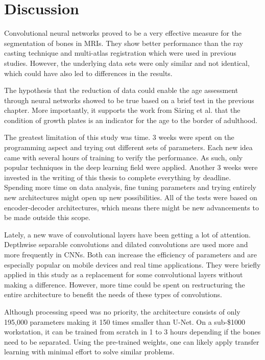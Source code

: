 \section{Discussion}

Convolutional neural networks proved to be a very effective measure for the segmentation of bones in MRIs. They show better performance than the ray casting technique and multi-atlas registration which were used in previous studies. However, the underlying data sets were only similar and not identical, which could have also led to differences in the results.

The hypothesis that the reduction of data could enable the age assessment through neural networks showed to be true based on a brief test in the previous chapter. More importantly, it supports the work from Säring et al. that the condition of growth plates is an indicator for the age to the border of adulthood.

The greatest limitation of this study was time. 3 weeks were spent on the programming aspect and trying out different sets of parameters. Each new idea came with several hours of training to verify the performance. As such, only popular techniques in the deep learning field were applied. Another 3 weeks were invested in the writing of this thesis to complete everything by deadline. Spending more time on data analysis, fine tuning parameters and trying entirely new architectures might open up new possibilities. All of the tests were based on encoder-decoder architectures, which means there might be new advancements to be made outside this scope.

Lately, a new wave of convolutional layers have been getting a lot of attention. Depthwise separable convolutions and dilated convolutions are used more and more frequently in CNNs. Both can increase the efficiency of parameters and are especially popular on mobile devices and real time applications. They were briefly applied in this study as a replacement for some convolutional layers without making a difference. However, more time could be spent on restructuring the entire architecture to benefit the needs of these types of convolutions.

Although processing speed was no priority, the architecture consists of only 195,000 parameters making it 150 times smaller than U-Net. On a sub-\$1000 workstation, it can be trained from scratch in 1 to 3 hours depending if the bones need to be separated. Using the pre-trained weights, one can likely apply transfer learning with minimal effort to solve similar problems.

